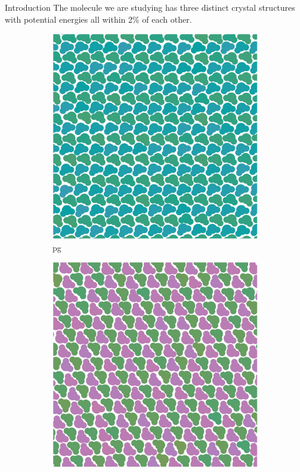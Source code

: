 \documentclass{beamer}
\begin{document}
\begin{frame}[t]{}
\begin{columns}[t]
\begin{column}{0.47\linewidth}
      \begin{block}{Introduction}
        The molecule we are studying has three distinct crystal structures
        with potential energies all within 2\% of each other.
        \begin{figure}[h]
          \centering
          \begin{subfigure}[t]{0.3\linewidth}
              \includegraphics[width=\linewidth]{trimer-crys-pg}
            \caption{pg}
            \label{fig:crystals pg}
          \end{subfigure}
          \begin{subfigure}[t]{0.3\linewidth}
              \includegraphics[width=\linewidth]{trimer-crys-p2}

\end{subfigure}
\end{figure}
\end{block}
\end{column}
\end{columns}
\end{frame}
\end{document}
